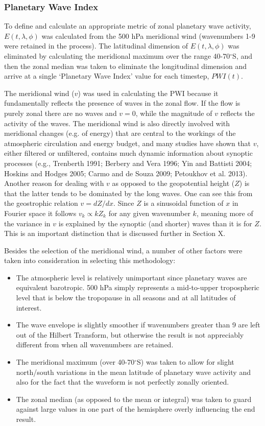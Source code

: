 \subsubsection{Planetary Wave Index}

To define and calculate an appropriate metric of zonal planetary wave activity, $E(t,\lambda,\phi)$ was calculated from the 500 hPa meridional wind (wavenumbers 1-9 were retained in the process). The latitudinal dimension of $E(t,\lambda,\phi)$ was eliminated by calculating the meridional maximum over the range 40-70$^{\circ}$S, and then the zonal median was taken to eliminate the longitudinal dimension and arrive at a single `Planetary Wave Index' value for each timestep, $PWI(t)$. 

The meridional wind ($v$) was used in calculating the PWI because it fundamentally reflects the presence of waves in the zonal flow. If the flow is purely zonal there are no waves and $v = 0$, while the magnitude of $v$ reflects the activity of the waves. The meridional wind is also directly involved with meridional changes (e.g. of energy) that are central to the workings of the atmospheric circulation and energy budget, and many studies have shown that $v$, either filtered or unfiltered, contains much dynamic information about synoptic processes (e.g., Trenberth 1991; Berbery and Vera 1996; Yin and Battisti 2004; Hoskins and Hodges 2005; Carmo and de Souza 2009; Petoukhov et al. 2013). Another reason for dealing with $v$ as opposed to the geopotential height ($Z$) is that the latter tends to be dominated by the long waves. One can see this from the geostrophic relation $v = dZ / dx$. Since $Z$ is a sinusoidal function of $x$ in Fourier space it follows $v_k \propto k Z_k$ for any given wavenumber $k$, meaning more of the variance in $v$ is explained by the synoptic (and shorter) waves than it is for $Z$. This is an important distinction that is discussed further in Section X.

Besides the selection of the meridional wind, a number of other factors were taken into consideration in selecting this methodology:
\begin{itemize}
\item The atmospheric level is relatively unimportant since planetary waves are equivalent barotropic. 500 hPa simply represents a mid-to-upper tropospheric level that is below the tropopause in all seasons and at all latitudes of interest.
\item The wave envelope is slightly smoother if wavenumbers greater than 9 are left out of the Hilbert Transform, but otherwise the result is not appreciably different from when all wavenumbers are retained.
\item The meridional maximum (over 40-70$^{\circ}$S) was taken to allow for slight north/south variations in the mean latitude of planetary wave activity and also for the fact that the waveform is not perfectly zonally oriented. 
\item The zonal median (as opposed to the mean or integral) was taken to guard against large values in one part of the hemisphere overly influencing the end result.
\end{itemize}

